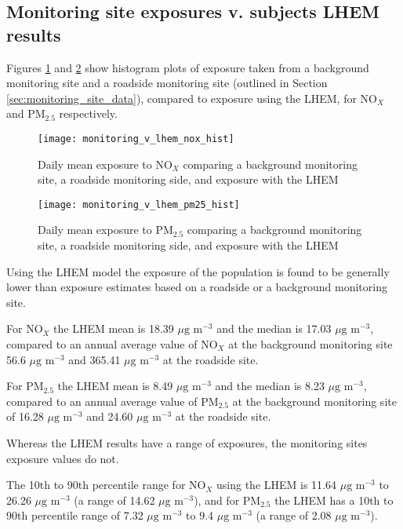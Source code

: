 \subsection{Monitoring site exposures v. subjects LHEM results}
\label{subsec:background_monitoring_v_lhem}

Figures \ref{fig:monitoring_v_lhem_nox_hist} and \ref{fig:monitoring_v_lhem_pm25_hist} show histogram plots of exposure taken from a background monitoring site and a roadside monitoring site (outlined in Section \ref{sec:monitoring_site_data}), compared to exposure using the LHEM, for NO$_{X}$ and PM$_{2.5}$ respectively.

\begin{figure}[H]
\centering
\texttt{[image: monitoring\_v\_lhem\_nox\_hist]}
\caption{Daily mean exposure to NO$_{X}$ comparing a background monitoring site, a roadside monitoring side, and exposure with the LHEM}
\label{fig:monitoring_v_lhem_nox_hist}
\end{figure}

\begin{figure}[H]
\centering
\texttt{[image: monitoring\_v\_lhem\_pm25\_hist]}
\caption{Daily mean exposure to PM$_{2.5}$ comparing a background monitoring site, a roadside monitoring side, and exposure with the LHEM}
\label{fig:monitoring_v_lhem_pm25_hist}
\end{figure}

Using the LHEM model the exposure of the population is found to be generally lower than exposure estimates based on a roadside or a background monitoring site.

For NO$_{X}$ the LHEM mean is 18.39 $\mu \text{g m}^{-3}$ and the median is 17.03 $\mu \text{g m}^{-3}$, compared to an annual average value of NO$_{X}$ at the background monitoring site 56.6 $\mu \text{g m}^{-3}$ and 365.41 $\mu \text{g m}^{-3}$ at the roadside site.

For PM$_{2.5}$ the LHEM mean is 8.49 $\mu \text{g m}^{-3}$ and the median is 8.23 $\mu \text{g m}^{-3}$, compared to an annual average value of PM$_{2.5}$ at the background monitoring site of 16.28 $\mu \text{g m}^{-3}$ and 24.60 $\mu \text{g m}^{-3}$ at the roadside site.

Whereas the LHEM results have a range of exposures, the monitoring sites exposure values do not.

The 10th to 90th percentile range for NO$_{X}$ using the LHEM is 11.64 $\mu \text{g m}^{-3}$ to 26.26 $\mu \text{g m}^{-3}$ (a range of 14.62 $\mu \text{g m}^{-3}$), and for PM$_{2.5}$ the LHEM has a 10th to 90th percentile range of 7.32 $\mu \text{g m}^{-3}$ to 9.4 $\mu \text{g m}^{-3}$ (a range of 2.08 $\mu \text{g m}^{-3}$).

